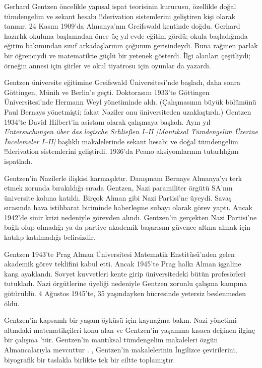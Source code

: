 




Gerhard Gentzen öncelikle yapısal ispat teorisinin kurucusu, özellikle doğal
tümdengelim ve sekant hesabı !!{derivation} sistemlerini geliştiren kişi
olarak tanınır. 24 Kasım 1909'da Almanya'nın Greifswald kentinde doğdu.
Gerhard hazırlık okuluna başlamadan önce üç yıl evde eğitim gördü; okula
başladığında eğitim bakımından sınıf arkadaşlarının çoğunun gerisindeydi.
Buna rağmen parlak bir öğrenciydi ve matematikte güçlü bir yetenek gösterdi.
İlgi alanları çeşitliydi; örneğin annesi için şiirler ve okul tiyatrosu için
oyunlar da yazardı.

Gentzen üniversite eğitimine Greifswald Üniversitesi'nde başladı, daha sonra
Göttingen, Münih ve Berlin'e geçti. Doktorasını 1933'te Göttingen
Üniversitesi'nde Hermann Weyl yönetiminde aldı. (Çalışmasının büyük bölümünü
Paul Bernays yönetmişti; fakat Naziler onu üniversiteden uzaklaştırdı.)
Gentzen 1934'te David Hilbert'in asistanı olarak çalışmaya başladı. Aynı yıl
\emph{Untersuchungen über das logische Schließen I--II [Mantıksal
Tümdengelim Üzerine İncelemeler I--II]} başlıklı makalelerinde sekant hesabı
ve doğal tümdengelim !!{derivation} sistemlerini geliştirdi. 1936'da Peano
aksiyomlarının tutarlılığını ispatladı.

Gentzen'in Nazilerle ilişkisi karmaşıktır. Danışmanı Bernays Almanya'yı terk
etmek zorunda bırakıldığı sırada Gentzen, Nazi paramiliter örgütü SA'nın
üniversite koluna katıldı. Birçok Alman gibi Nazi Partisi'ne üyeydi. Savaş
sırasında hava istihbarat biriminde haberleşme subayı olarak görev yaptı.
Ancak 1942'de sinir krizi nedeniyle görevden alındı. Gentzen'in gerçekten
Nazi Partisi'ne bağlı olup olmadığı ya da partiye akademik başarısını güvence
altına almak için katılıp katılmadığı belirsizdir.

Gentzen 1943'te Prag Alman Üniversitesi Matematik Enstitüsü'nden gelen
akademik görev teklifini kabul etti. Ancak 1945'te Prag halkı Alman işgaline
karşı ayaklandı. Sovyet kuvvetleri kente girip üniversitedeki bütün
profesörleri tutukladı. Nazi örgütlerine üyeliği nedeniyle Gentzen zorunlu
çalışma kampına götürüldü. 4 Ağustos 1945'te, 35 yaşındayken hücresinde
yetersiz beslenmeden öldü.

\begin{reading}
Gentzen'in kapsamlı bir yaşam öyküsü için \citet{Menzler-Trott2007}
kaynağına bakın. Nazi yönetimi altındaki matematikçileri konu alan ve
Gentzen'in yaşamına kısaca değinen ilginç bir çalışma
\citet{Segal2014}'tür. Gentzen'in mantıksal tümdengelim makaleleri özgün
Almancalarıyla mevcuttur \citep{Gentzen1935a,Gentzen1935b}.
\citet{Gentzen1969}, Gentzen'in makalelerinin İngilizce çevirilerini,
biyografik bir taslakla birlikte tek bir ciltte toplamıştır.
\end{reading}

